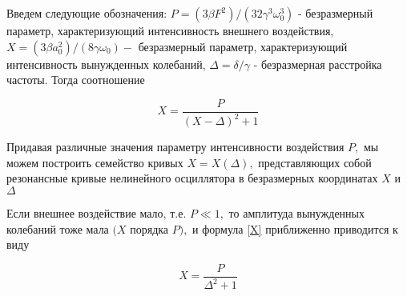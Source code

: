 \documentclass[11pt]{article}
\begin{document}
Введем следующие обозначения:
\(P=\left(3 \beta F^{2}\right) /\left(32 \gamma^{3} \omega_{0}^{3}\right)\)
- безразмерный параметр, характеризующий интенсивность внешнего
воздействия,
\(X=\left(3 \beta a_{0}^{2}\right) /\left(8 \gamma \omega_{0}\right)-\)
безразмерный параметр, характеризующий интенсивность вынужденных
колебаний, \(\Delta=\delta / \gamma\) - безразмерная расстройка частоты.
Тогда соотношение

\begin{equation}
\label{X}
X=\frac{P}{(X-\Delta)^{2}+1}
\end{equation}

Придавая различные значения параметру интенсивности воздействия \(P,\)
мы можем построить семейство кривых \(X=X(\Delta),\) представляющих
собой резонансные кривые нелинейного осциллятора в безразмерных
координатах \(X\) и \(\Delta\)

Если внешнее воздействие мало, т.е. \(P \ll 1,\) то амплитуда
вынужденных колебаний тоже мала \((X\) порядка \(P),\) и формула
\eqref{X} приближенно приводится к виду

\begin{equation}
X=\frac{P}{\Delta^{2}+1}
\end{equation}
\end{document}
